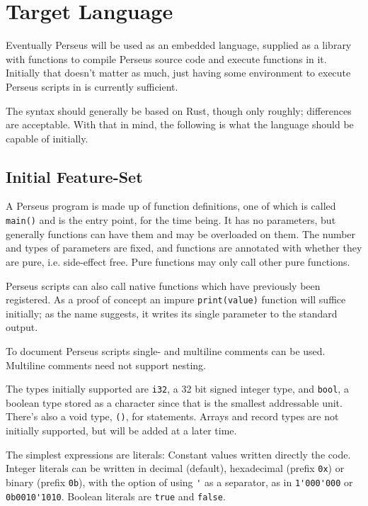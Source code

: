     \section{Target Language}
    
    	Eventually Perseus will be used as an embedded language, supplied as a library with functions to compile Perseus source code and execute functions in it. Initially that doesn't matter as much, just having some environment to execute Perseus scripts in is currently sufficient.
    	
    	The syntax should generally be based on Rust\cite{rust}, though only roughly; differences are acceptable. With that in mind, the following is what the language should be capable of initially.
    	
    	\subsection{Initial Feature-Set}
    	
			A Perseus program is made up of function definitions, one of which is called \lstinline$main()$ and is the entry point, for the time being. It has no parameters, but generally functions can have them and may be overloaded on them. The number and types of parameters are fixed, and functions are annotated with whether they are pure, i.e. side-effect free. Pure functions may only call other pure functions.
			
			Perseus scripts can also call native functions which have previously been registered. As a proof of concept an impure \lstinline$print(value)$ function will suffice initially; as the name suggests, it writes its single parameter to the standard output.
			
			To document Perseus scripts single- and multiline comments can be used. Multiline comments need not support nesting.
			
			The types initially supported are \lstinline$i32$, a 32 bit signed integer type, and \lstinline$bool$, a boolean type stored as a character since that is the smallest addressable unit. There's also a void type, \lstinline$()$, for statements. Arrays and record types are not initially supported, but will be added at a later time.
	    	
	    	The simplest expressions are literals: Constant values written directly the code. Integer literals can be written in decimal (default), hexadecimal (prefix \lstinline$0x$) or binary (prefix \lstinline$0b$), with the option of using \lstinline$'$ as a separator, as in \lstinline$1'000'000$ or \lstinline$0b0010'1010$. Boolean literals are \lstinline$true$ and \lstinline$false$.
	    	

